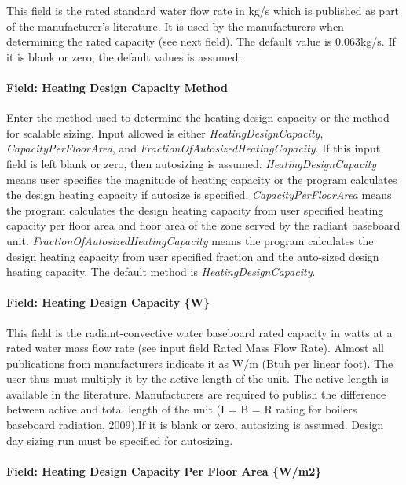 This field is the rated standard water flow rate in kg/s which is published as part of the manufacturer's literature. It is used by the manufacturers when determining the rated capacity (see next field). The default value is 0.063kg/s. If it is blank or zero, the default values is assumed.

\paragraph{Field: Heating Design Capacity Method}\label{field-heating-design-capacity-method-000}

Enter the method used to determine the heating design capacity or the method for scalable sizing. Input allowed is either \emph{HeatingDesignCapacity}, \emph{CapacityPerFloorArea}, and \emph{FractionOfAutosizedHeatingCapacity}. If this input field is left blank or zero, then autosizing is assumed. \emph{HeatingDesignCapacity} means user specifies the magnitude of heating capacity or the program calculates the design heating capacity if autosize is specified. \emph{CapacityPerFloorArea} means the program calculates the design heating capacity from user specified heating capacity per floor area and floor area of the zone served by the radiant baseboard unit. \emph{FractionOfAutosizedHeatingCapacity} means the program calculates the design heating capacity from user specified fraction and the auto-sized design heating capacity. The default method is \emph{HeatingDesignCapacity}.

\paragraph{Field: Heating Design Capacity \{W\}}\label{field-heating-design-capacity-w-000}

This field is the radiant-convective water baseboard rated capacity in watts at a rated water mass flow rate (see input field Rated Mass Flow Rate). Almost all publications from manufacturers indicate it as W/m (Btuh per linear foot). The user thus must multiply it by the active length of the unit. The active length is available in the literature. Manufacturers are required to publish the difference between active and total length of the unit (I = B = R rating for boilers baseboard radiation, 2009).If it is blank or zero, autosizing is assumed. Design day sizing run must be specified for autosizing.

\paragraph{Field: Heating Design Capacity Per Floor Area \{W/m2\}}\label{field-heating-design-capacity-per-floor-area-wm2-000}

